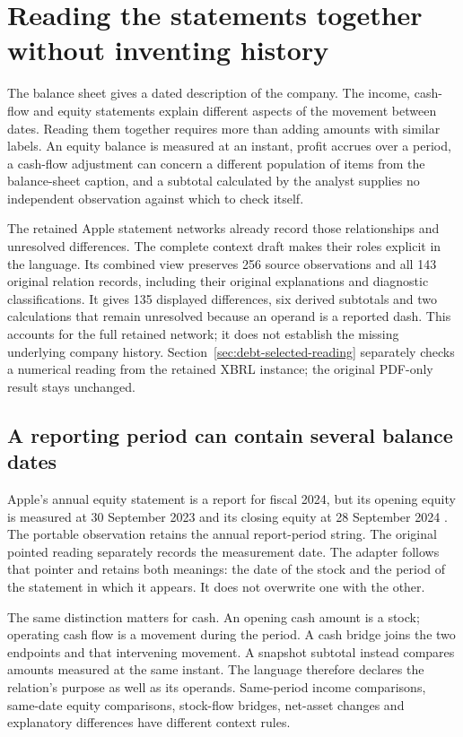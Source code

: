 \section{Reading the statements together without inventing history}
\label{sec:statement-context-relations}

The balance sheet gives a dated description of the company. The income,
cash-flow and equity statements explain different aspects of the movement
between dates. Reading them together requires more than adding amounts with
similar labels. An equity balance is measured at an instant, profit accrues
over a period, a cash-flow adjustment can concern a different population of
items from the balance-sheet caption, and a subtotal calculated by the
analyst supplies no independent observation against which to check itself.

The retained Apple statement networks already record those relationships
and unresolved differences. The complete context draft makes their roles
explicit in the language. Its combined view preserves 256 source observations
and all 143 original relation records, including their original explanations
and diagnostic classifications. It gives 135 displayed differences, six
derived subtotals and two calculations that remain unresolved because an
operand is a reported dash. This accounts for the full retained network;
it does not establish the missing underlying company history.
Section~\ref{sec:debt-selected-reading} separately checks a numerical reading
from the retained XBRL instance; the original PDF-only result stays unchanged.

\subsection{A reporting period can contain several balance dates}

Apple's annual equity statement is a report for fiscal 2024, but its opening
equity is measured at 30 September 2023 and its closing equity at
28 September 2024 \citep[p.~32]{apple2024}. The portable observation retains
the annual report-period string. The original pointed reading separately
records the measurement date. The adapter follows that pointer and retains
both meanings: the date of the stock and the period of the statement in
which it appears. It does not overwrite one with the other.

The same distinction matters for cash. An opening cash amount is a stock;
operating cash flow is a movement during the period. A cash bridge joins
the two endpoints and that intervening movement. A snapshot subtotal instead
compares amounts measured at the same instant. The language therefore
declares the relation's purpose as well as its operands. Same-period income
comparisons, same-date equity comparisons, stock-flow bridges, net-asset
changes and explanatory differences have different context rules.

